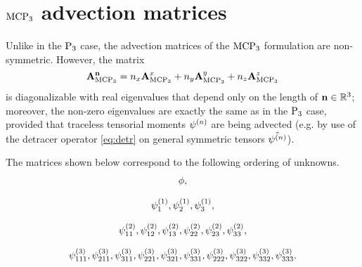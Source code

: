 \chapter{$\MCPN[3]$ advection matrices}\label{app:C}
Unlike in the $\PN[3]$ case, the advection matrices of the $\MCPN[3]$ formulation are non-symmetric. However,  the
matrix 
$$
\mat{A}_{\MCPN[3]}^{\bn} = n_x \mat{A}_{\MCPN[3]}^x + n_y \mat{A}_{\MCPN[3]}^y + n_z \mat{A}_{\MCPN[3]}^z
$$
is diagonalizable with real eigenvalues that depend only on the length of $\bn\in\R[3]$; moreover, the non-zero
eigenvalues are exactly the same as in the $\PN[3]$ case, provided that traceless tensorial moments $\fmom$ are being advected (e.g. by use of
the detracer operator \eqref{eq:detr} on general symmetric tensors $\hat\fmom$).

The matrices shown below correspond to the following ordering of unknowns.
$$
\begin{gathered}
\phi,\\[.75em]
\fmom[1]_{1},\fmom[1]_{2},\fmom[1]_{3},\\[.75em]
\fmom[2]_{11},\fmom[2]_{12},\fmom[2]_{13},\fmom[2]_{22},\fmom[2]_{23},\fmom[2]_{33},\\[.75em]
\fmom[3]_{111},\fmom[3]_{211},\fmom[3]_{311},\fmom[3]_{221},\fmom[3]_{321},\fmom[3]_{331},\fmom[3]_{222},\fmom[3]_{322},\fmom[3]_{332},\fmom[3]_{333}.
\end{gathered}
$$

